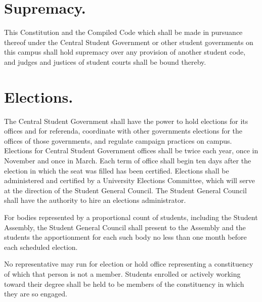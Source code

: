 \section{Supremacy.}
    This Constitution and the Compiled Code which shall be made in pursuance thereof under the Central Student Government or other student governments on this campus shall hold supremacy over any provision of another student code, and judges and justices of student courts shall be bound thereby.

\section{Elections.}
    The Central Student Government shall have the power to hold elections for its offices and for referenda, coordinate with other governments elections for the offices of those governments, and regulate campaign practices on campus. Elections for Central Student Government offices shall be twice each year, once in November and once in March. Each term of office shall begin ten days after the election in which the seat was filled has been certified. Elections shall be administered and certified by a University Elections Committee, which will serve at the direction of the Student General Council. The Student General Council shall have the authority to hire an elections administrator.

    For bodies represented by a proportional count of students, including the Student Assembly, the Student General Council shall present to the Assembly and the students the apportionment for each such body no less than one month before each scheduled election.

    No representative may run for election or hold office representing a constituency of which that person is not a member. Students enrolled or actively working toward their degree shall be held to be members of the constituency in which they are so engaged.